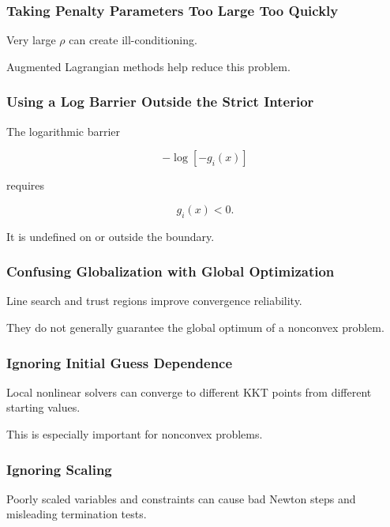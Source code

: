 \subsubsection{Taking Penalty Parameters Too Large Too Quickly}

Very large \(\rho\) can create ill-conditioning.

Augmented Lagrangian methods help reduce this problem.

\subsubsection{Using a Log Barrier Outside the Strict Interior}

The logarithmic barrier

\[
-\log[-g_i(x)]
\]

requires

\[
\boxed{
g_i(x)<0.
}
\]

It is undefined on or outside the boundary.

\subsubsection{Confusing Globalization with Global Optimization}

Line search and trust regions improve convergence reliability.

They do not generally guarantee the global optimum of a nonconvex
problem.

\subsubsection{Ignoring Initial Guess Dependence}

Local nonlinear solvers can converge to different KKT points from
different starting values.

This is especially important for nonconvex problems.

\subsubsection{Ignoring Scaling}

Poorly scaled variables and constraints can cause bad Newton steps and
misleading termination tests.


